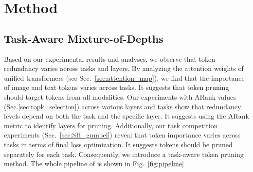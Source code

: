 
    





\section{Method}




\subsection{Task-Aware Mixture-of-Depths}

Based on our experimental results and analyses, we observe that token redundancy varies across tasks and layers. By analyzing the attention weights of unified transformers (see Sec.~\ref{sec:attention_map}), we find that the importance of image and text tokens varies across tasks. It suggests that token pruning should target tokens from all modalities. Our experiments with ARank values (Sec.\ref{sec:topk_selection}) across various layers and tasks show that redundancy levels depend on both the task and the specific layer. It suggests using the ARank metric to identify layers for pruning. Additionally, our task competition experiments (Sec.~\ref{sec:SH_gumbel}) reveal that token importance varies across tasks in terms of final loss optimization. It suggests tokens should be pruned separately for each task. Consequently, we introduce a task-aware token pruning method. The whole pipeline of \method{} is shown in Fig.~\ref{fig:pipeline}


